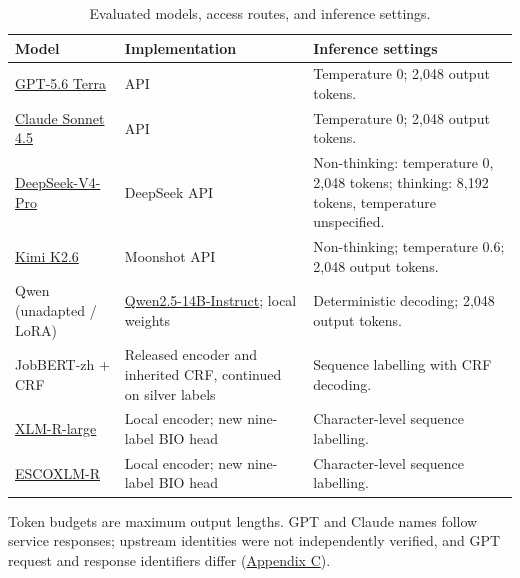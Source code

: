 \documentclass[fleqn,12pt]{wlpeerj}
\begin{document}
\setcounter{table}{4}
\begin{table}[!htbp]
\centering\small
\caption{Evaluated models, access routes, and inference settings.}
\label{tab:model-identity}
\begin{tabularx}{\linewidth}{@{}P{.22\linewidth}P{.32\linewidth}L@{}}
\toprule
Model & Implementation & Inference settings \\
\midrule
\href{https://developers.openai.com/api/docs/models/gpt-5.6-terra}{GPT-5.6 Terra} & API & Temperature 0; 2,048 output tokens. \\
\href{https://platform.claude.com/docs/en/about-claude/models/model-ids-and-versions}{Claude Sonnet 4.5} & API & Temperature 0; 2,048 output tokens. \\
\href{https://api-docs.deepseek.com/news/news260813/}{DeepSeek-V4-Pro} & DeepSeek API & Non-thinking: temperature 0, 2,048 tokens; thinking: 8,192 tokens, temperature unspecified. \\
\href{https://platform.kimi.com/docs/guide/kimi-k2-6-quickstart}{Kimi K2.6} & Moonshot API & Non-thinking; temperature 0.6; 2,048 output tokens. \\
Qwen (unadapted / LoRA) & \href{https://huggingface.co/Qwen/Qwen2.5-14B-Instruct}{Qwen2.5-14B-Instruct}; local weights & Deterministic decoding; 2,048 output tokens. \\
JobBERT-zh + CRF & Released encoder and inherited CRF, continued on silver labels & Sequence labelling with CRF decoding. \\
\href{https://huggingface.co/FacebookAI/xlm-roberta-large}{XLM-R-large} & Local encoder; new nine-label BIO head & Character-level sequence labelling. \\
\href{https://huggingface.co/jjzha/esco-xlm-roberta-large}{ESCOXLM-R} & Local encoder; new nine-label BIO head & Character-level sequence labelling. \\
\bottomrule
\end{tabularx}
\par\smallskip\footnotesize\RaggedRight
Token budgets are maximum output lengths. GPT and Claude names follow service responses; upstream identities were not independently verified, and GPT request and response identifiers differ (\hyperref[app:c]{Appendix C}).
\end{table}

\end{document}
